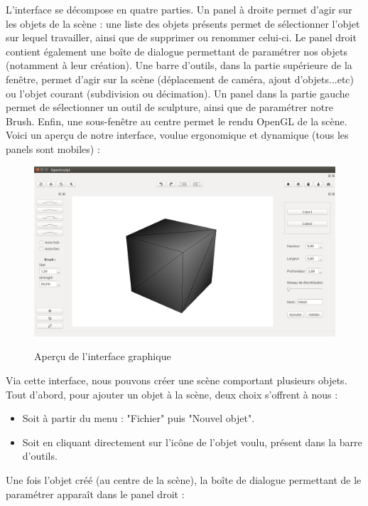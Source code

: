 \documentclass[a4paper]{memoir}
\begin{document}
			\label{man-user}
			L'interface se décompose en quatre parties. Un panel à droite permet d'agir sur les objets de la scène : une liste des objets présents permet de 
			sélectionner l'objet sur lequel travailler, ainsi que de supprimer ou renommer celui-ci. Le panel droit contient également une boîte de dialogue 
			permettant de paramétrer nos objets (notamment à leur création). Une barre d'outils, dans la partie supérieure de la fenêtre, permet d'agir 
			sur la scène (déplacement de caméra, ajout d'objets...etc) ou l'objet courant (subdivision ou décimation). Un panel dans la partie gauche permet 
			de sélectionner un outil de sculpture, ainsi que de paramétrer notre Brush. Enfin, une sous-fenêtre au centre permet le rendu OpenGL de la scène.
			\\Voici un aperçu de notre interface, voulue ergonomique et dynamique (tous les panels sont mobiles) :
			\begin{figure}[H]
				\begin{center}
					\includegraphics[scale=0.27]{img/interface.png}
					\label{fig:interface}
					\caption{Aperçu de l'interface graphique}
				\end{center}
			\end{figure}
			Via cette interface, nous pouvons créer une scène comportant plusieurs objets. Tout d'abord, pour ajouter un objet à la scène, deux choix 
			s'offrent à nous :
			\begin{itemize}
				\item Soit à partir du menu : "Fichier" puis  "Nouvel objet".
				\item Soit en cliquant directement sur l'icône de l'objet voulu, présent dans la barre d'outils.
			\end{itemize}
			Une fois l'objet créé (au centre de la scène), la boîte de dialogue permettant de le paramétrer apparaît dans le panel droit :
\end{document}
